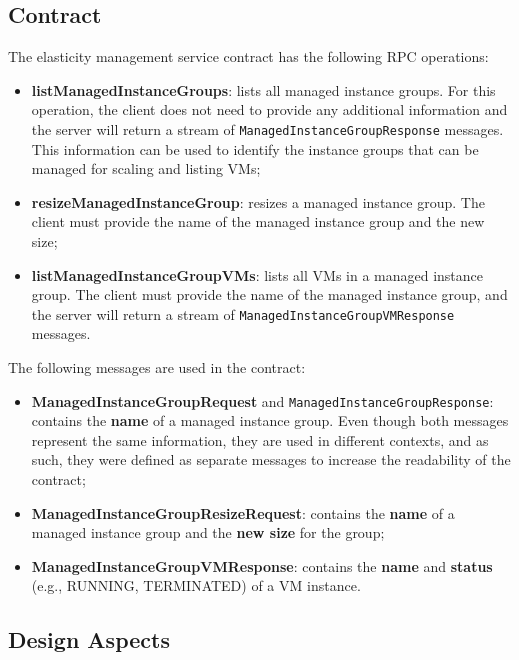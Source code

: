 \subsection{Contract}\label{subsec:elasticity-management-contract}

The elasticity management service contract has the following RPC operations:

\begin{itemize}
    \item \textbf{listManagedInstanceGroups}: lists all managed instance groups.
    For this operation,
    the client does not need to provide any additional information
    and the server will return a stream of \texttt{ManagedInstanceGroupResponse} messages.
    This information can be used to identify the instance groups that can be managed for scaling and listing VMs;
    \item \textbf{resizeManagedInstanceGroup}: resizes a managed instance group.
    The client must provide the name of the managed instance group and the new size;
    \item \textbf{listManagedInstanceGroupVMs}: lists all VMs in a managed instance group.
    The client must provide the name of the managed instance group, and the server will return a stream of \texttt{ManagedInstanceGroupVMResponse} messages.
\end{itemize}

The following messages are used in the contract:

\begin{itemize}
    \item \textbf{ManagedInstanceGroupRequest} and \texttt{ManagedInstanceGroupResponse}:
    contains the \textbf{name} of a managed instance group.
    Even though both messages represent the same information, they are used in different contexts,
    and as such, they were defined as separate messages to increase the readability of the contract;
    \item \textbf{ManagedInstanceGroupResizeRequest}:
    contains the \textbf{name} of a managed instance group and the \textbf{new size} for the group;
    \item \textbf{ManagedInstanceGroupVMResponse}: contains the \textbf{name} and \textbf{status} (e.g., RUNNING, TERMINATED) of a VM instance.
\end{itemize}

\subsection{Design Aspects}\label{subsec:elasticity-management-design-aspects}


